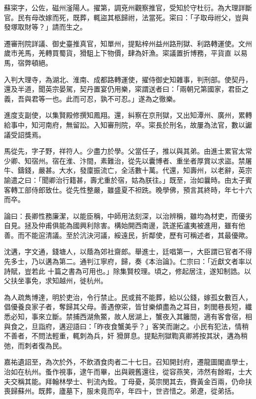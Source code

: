 \begin{pinyinscope}
 蘇寀字，公佐，磁州滏陽人。擢第，調兗州觀察推官，受知於守杜衍。為大理詳斷官。民有母改嫁而死，既葬，輒盜其柩歸祔，法當死。寀曰：「子取母祔父，豈與發塚取財等？」請而生之。



 遷審刑院詳議、御史臺推真官，知單州，提點梓州益州路刑獄、利路轉運使。文州歲市羌馬，羌轉買蜀貨，猾駔上下物價，肆為奸漁。寀議置折博務，平貨直
 以易馬，宿弊頓絕。



 入判大理寺，為湖北、淮南、成都路轉運使，擢侍御史知雜事，判刑部。使契丹，還及半道，聞英宗晏駕，契丹置宴仍用樂，寀謂送者曰：「兩朝兄第國家，君臣之義，吾與君等一也。此而可忍，孰不可忍。」遂為之徹樂。



 進度支副使，以集賢殿修撰知鳳翔。還，糾察在京刑獄，又出知潭州、廣州，累轉給事中，知河南府，無留訟。入知審刑院，卒。寀長於刑名，故屢為法官，數以讞議受詔獎焉。



 馬從先，字子野，祥符人。少盡力於學。父當任子，推以與其弟。由進士累官太常少卿、知宿州。宿在淮、汴間，素難治，從先以囊博者、重坐者厚賞以求盜。禁屠牛、鑄錢，嚴甚。大水，發廩振流亡，全活數十萬。代還，知壽州，以老辭，英宗諭遣之曰：「聞卿治行籍甚，壽尤重於宿，姑為朕往。」既至，治如曩時。由太子賓客轉工部侍郎致仕。從先性整嚴，雖盛夏不袒跣。晚學佛，預言其終時，年七十六而卒。



 論曰：長卿性務廉潔，以能臣稱，中師用法刻深，以治辨稱，雖均為材吏，而優劣自見。拯及仲甫俱能為國興利除害。構始開西南邊，詵遂拓瀘夷被進用，雖有他善。而不能逭清議。至於沆決河議，綏遠民，折鄰使，歷有可稱述者，其最優歟。



 沈遘，字文通，錢塘人，以蔭為郊社齋郎。舉進士，廷唱第一，大臣謂已官者不得先多士，乃以遘為第二。通判江寧府，歸，奏《本治論》。仁宗曰：「近獻文者率以詩賦，豈若此
 十篇之書為可用也。」除集賢校理。頃之，修起居注，遂知制誥。以父扶坐事免，求知越州，徙杭州。



 為人疏雋博達，明於吏治，令行禁止。民或貧不能葬，給以公錢，嫁孤女數百人，倡優養良家子者，奪歸其父母。善遇僚寀，皆甘樂傾盡為之耳目，刺閭巷長短，纖悉必知，事來立斷。禁捕西湖魚鱉，故人居湖上，蟹夜入其籬間，適有客會宿，相與食之，旦詣府，遘迎語曰：「昨夜食蟹美乎？」客笑而謝之。小民有犯法，情稍不善者，不問法輕重，輒刺為兵，奸
 猾屏息。提點刑獄鞫真卿將按其狀，遘為稍弛，而刺者復為民。



 嘉祐遺詔至，為次於外，不飲酒食肉者二十七日。召知開封府，遷龍圖閣直學士，治如在杭州。蚤作視事，逮午而畢，出與親舊還往，從容燕笑，沛然有餘暇，士大夫交稱其能。拜翰林學士、判流內銓。丁母憂，英宗閔其去，賚黃金百兩，仍命扶喪歸蘇州。既葬，廬墓下，服未竟而卒，年四十，世咨惜之。弟遼，從弟括。




\end{pinyinscope}
